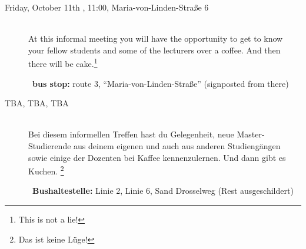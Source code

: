 \begin{description}


\ifmaster
    \ifml
        \item[Friday, October 11th \YEAR, 11:00, Maria-von-Linden-Straße 6]\ \\
    At this informal meeting you will have the opportunity to get to know your fellow students and some of the lecturers over a coffee. And then there will be cake.\footnote{This is not a lie!}

        ~\textbf{bus stop:} route 3, "`Maria-von-Linden-Straße"' (signposted from there)
    \else
    \item[TBA, TBA, TBA]\ \\
    Bei diesem informellen Treffen hast du Gelegenheit, neue Master-Studierende aus deinem eigenen und auch aus anderen Studiengängen sowie einige der Dozenten bei Kaffee kennenzulernen. Und dann gibt es Kuchen. \footnote{Das ist keine Lüge!}

        ~\textbf{Bushaltestelle:} Linie 2, Linie 6, Sand Drosselweg (Rest ausgeschildert)
    \fi
\fi


\end{description}
